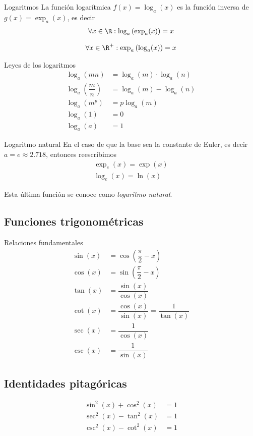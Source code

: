 {Logaritmos}
  La función logarítmica $f(x)=\log_{a}(x)$ es la función inversa de $g(x) = \exp_{a}(x)$, 
   es decir 
       \begin{align*}
    \forall x \in \R: \log_{a}\left( \exp_{a}(x) \right) = x
    \end{align*}
    
         \begin{align*}
     \forall x \in \R^{+}: \exp_{a}\left( \log_{a}(x) \right) = x
     \end{align*}

{Leyes de los logaritmos}
     \begin{align*}
   \log_{a}(mn)&= \log_{a}(m)\cdot \log_{a}(n) \\
   \log_{a}\left( \dfrac{m}{n} \right)&= \log_{a}(m)-\log_{a}(n) \\ 
   \log_{a}(m^{p}) &= p\log_{a}(m) \\ 
   \log_{a}(1)&= 0\\ 
   \log_{a}(a)&=1
   \end{align*}

{Logaritmo natural}
  En el caso de que la base sea la constante de Euler, es decir $a=e\approx 2.718$, entonces reescribimos
     \begin{align*}
   \exp_{e}(x)=\exp(x)\\ 
   \log_{e}(x)=\ln(x)
   \end{align*}
   
   Esta última función se conoce como \emph{logaritmo natural}.

\subsection{Funciones trigonométricas}
{Relaciones fundamentales}
\begin{align*}
\sin(x) &=\cos\left( \dfrac{\pi}{2}-x \right) \\    
\cos(x) &= \sin\left( \dfrac{\pi}{2}-x \right) \\    
\tan(x) &= \dfrac{\sin(x)}{\cos(x)} \\     
\cot(x) &= \dfrac{\cos(x)}{\sin(x)}=\dfrac{1}{\tan(x)} \\    
\sec(x) &= \dfrac{1}{\cos(x)} \\    
\csc(x) &= \dfrac{1}{\sin(x)}
\end{align*}

\subsection{Identidades pitagóricas}
\begin{align*}
\sin^{2}(x)+\cos^{2}(x)&= 1\\ 
\sec^{2}(x)-\tan^{2}(x)&= 1\\ 
\csc^{2}(x)-\cot^{2}(x)&= 1
\end{align*}

